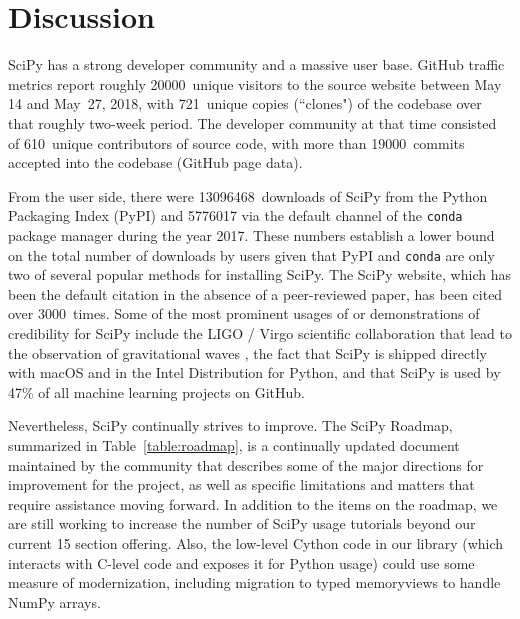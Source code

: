 \documentclass[fleqn,10pt]{wlscirep}
\begin{document}
\section*{Discussion}


SciPy has a strong developer community and a massive user base. GitHub traffic
metrics report roughly \num{20000}~unique visitors to the source website between May
14 and May~27, 2018, with 721~unique copies (``clones") of the codebase over
that roughly two-week period. The developer community at that time consisted of 610~unique
contributors of source code, with more than \num{19000}~commits accepted into the codebase
(GitHub page data).

From the user side, there were \num{13096468}~downloads of SciPy from the Python
Packaging Index (PyPI)\cite{pypinfo} and \num{5776017} via the default channel of the
\texttt{conda}\cite{condainfo} package manager during the year 2017. These numbers establish a lower
bound on the total number of downloads by users given that
PyPI and \texttt{conda} are only two of several popular methods for installing SciPy.  The SciPy
website\cite{SciPylib}, which has been the default citation in the absence of a
peer-reviewed paper, has been cited over \num{3000}~times\cite{googlescholar}. Some of the most prominent
usages of or demonstrations of credibility for SciPy include the LIGO / Virgo
scientific collaboration that lead to the observation of gravitational waves
\cite{PhysRevLett.116.061102}, the fact that SciPy is shipped directly with
macOS and in the Intel Distribution for Python\cite{intel-python}, and that SciPy is used
by 47\% of all machine learning projects on GitHub\cite{octoverse-scipy}.

Nevertheless, SciPy continually strives to improve.
The SciPy Roadmap\cite{SciPy_roadmap_1,SciPy_roadmap_dev}, summarized in Table~\ref{table:roadmap}, is a
continually updated document
maintained by the community that describes some of the major directions for
improvement for the project, as well as specific limitations and matters that
require assistance moving forward.
In addition to the items on the roadmap,
we are still working to increase the number of SciPy usage tutorials beyond
our current 15 section offering\cite{SciPy_tutorials}.
Also, the low-level Cython code in our library (which interacts with C-level code and
exposes it for Python usage) could use some measure of modernization, including
migration to typed memoryviews to handle NumPy arrays.
\end{document}
